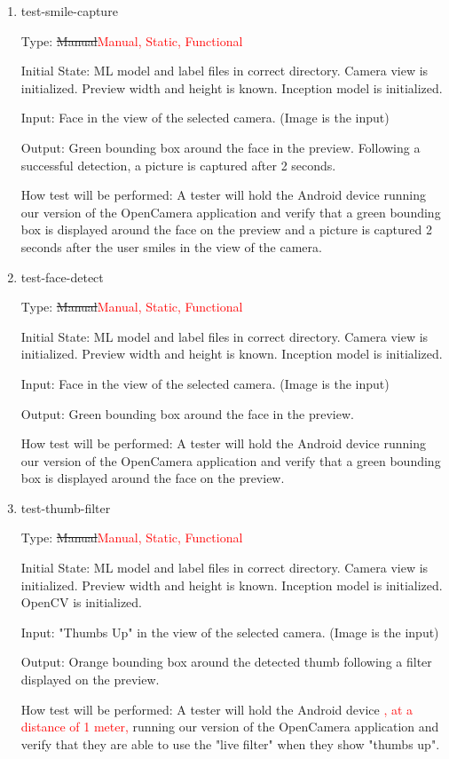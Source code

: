 \documentclass[12pt, titlepage]{article}
\begin{document}
\begin{enumerate}

\item{test-smile-capture\\}

Type: \sout{Manual}\textcolor{red}{Manual, Static, Functional}
					
Initial State: 
    ML model and label files in correct directory. Camera view is initialized. Preview width and height is known. Inception model is initialized. 
					
Input: Face in the view of the selected camera. (Image is the input)
					
Output: Green bounding box around the face in the preview. Following a successful detection, a picture is captured after 2 seconds. 
					
How test will be performed: A tester will hold the Android device running our version of the OpenCamera application and verify that a green bounding box is displayed around the face on the preview and a picture is captured 2 seconds after the user smiles in the view of the camera.

\item{test-face-detect\\}

Type: \sout{Manual}\textcolor{red}{Manual, Static, Functional}
					
Initial State: 
    ML model and label files in correct directory. Camera view is initialized. Preview width and height is known. Inception model is initialized. 
					
Input: Face in the view of the selected camera. (Image is the input)
					
Output: Green bounding box around the face in the preview. 
					
How test will be performed: A tester will hold the Android device running our version of the OpenCamera application and verify that a green bounding box is displayed around the face on the preview.

\item{test-thumb-filter\\}

Type: \sout{Manual}\textcolor{red}{Manual, Static, Functional}
					
Initial State: 
    ML model and label files in correct directory. Camera view is initialized. Preview width and height is known. Inception model is initialized. OpenCV is initialized. 
					
Input: "Thumbs Up" in the view of the selected camera. (Image is the input)
					
Output: Orange bounding box around the detected thumb following a filter displayed on the preview. 
					
How test will be performed: A tester will hold the Android device \textcolor{red}{, at a distance of 1 meter,} running our version of the OpenCamera application and verify that they are able to use the "live filter" when they show "thumbs up".

\end{enumerate}
\end{document}
